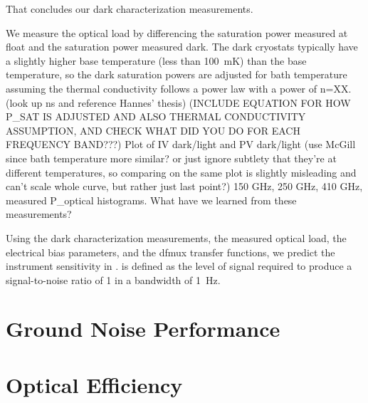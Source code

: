 That concludes our dark characterization measurements. 
 
We measure the optical load by differencing the saturation power measured at float and the saturation power measured dark. 
The dark cryostats typically have a slightly higher base temperature (less than 100~mK) than the  base temperature, so the dark saturation powers are adjusted for bath temperature assuming the thermal conductivity follows a power law with a power of n=XX. (look up ns and reference Hannes' thesis)
(INCLUDE EQUATION FOR HOW P_SAT IS ADJUSTED AND ALSO THERMAL CONDUCTIVITY ASSUMPTION, AND CHECK WHAT DID YOU DO FOR EACH FREQUENCY BAND???)
Plot of IV dark/light and PV dark/light (use McGill since bath temperature more similar? or just ignore subtlety that they're at different temperatures, so comparing on the same plot is slightly misleading and can't scale whole curve, but rather just last point?)
150 GHz, 250 GHz, 410 GHz, measured P_optical histograms.
What have we learned from these measurements?

Using the dark characterization measurements, the measured optical load, the electrical bias parameters, and the dfmux transfer functions, we predict the instrument sensitivity in . 
 is defined as the level of signal required to produce a signal-to-noise ratio of 1 in a bandwidth of 1~Hz.  





\section{Ground Noise Performance}
\label{ground_noise_section}



\section{Optical Efficiency}
\label{optical_efficiency_section}

